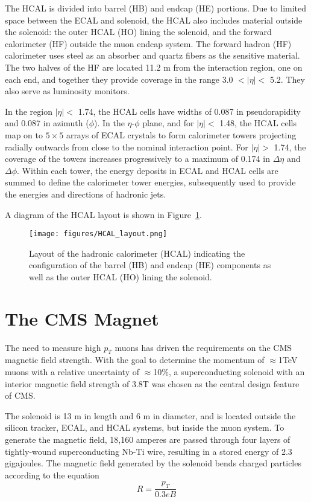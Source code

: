 The HCAL is divided into barrel (HB) and endcap (HE) portions. Due to limited space between the ECAL and solenoid, the HCAL also includes material outside the solenoid: the outer HCAL (HO) lining the solenoid, and the forward calorimeter (HF) outside the muon endcap system. The forward hadron (HF) calorimeter uses steel as an absorber and quartz fibers as the sensitive material. The two halves of the HF are located 11.2 m from the interaction region, one on each end, and together they provide coverage in the range 3.0 $< |\eta| <$ 5.2. They also serve as luminosity monitors\cite{TDR}.

In the region $|\eta| < $ 1.74, the HCAL cells have widths of 0.087 in pseudorapidity and 0.087 in azimuth ($\phi$). In the $\eta$-$\phi$ plane, and for $|\eta| <$ 1.48, the HCAL cells map on to $5 \times 5$ arrays of ECAL crystals to form calorimeter towers projecting radially outwards from close to the nominal interaction point. For $|\eta| >$ 1.74, the coverage of the towers increases progressively to a maximum of 0.174 in $\Delta \eta$ and $\Delta \phi$. Within each tower, the energy deposits in ECAL and HCAL cells are summed to define the calorimeter tower energies, subsequently used to provide the energies and directions of hadronic jets.


A diagram of the HCAL layout is shown in Figure~\ref{fig:HCAL_layout}.

\begin{figure}\centering
  \texttt{[image: figures/HCAL\_layout.png]}
  \caption{\label{fig:HCAL_layout} Layout of the hadronic calorimeter (HCAL) indicating the configuration of the barrel (HB) and endcap (HE) components as well as the outer HCAL (HO) lining the solenoid.}
\end{figure}

\section{The CMS Magnet}

The need to measure high $p_{T}$ muons has driven the requirements on the CMS magnetic field strength. With the goal to determine the momentum of $\approx$1TeV muons with a relative uncertainty of $\approx $10\%, a superconducting solenoid with an interior magnetic field strength of 3.8T was chosen as the central design feature of CMS.

The solenoid is 13 m in length and 6 m in diameter, and is located outside the silicon tracker, ECAL, and HCAL systems, but inside the muon system. To generate the magnetic field, 18,160 amperes are passed through four layers of tightly-wound superconducting Nb-Ti wire, resulting in a stored energy of 2.3 gigajoules. The magnetic field generated by the solenoid bends charged particles according to the equation
\begin{equation}
R = \frac{p_{T}}{0.3eB}
\end{equation}

